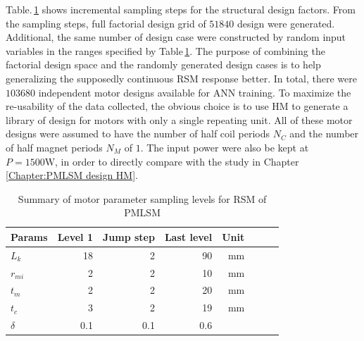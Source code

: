             
            Table.\,\ref{table:RSM design level for PMLSM} shows incremental sampling steps for the structural design factors. From the sampling steps, full factorial design grid of $51840$ design were generated. Additional, the same number of design case were constructed by random input variables in the ranges specified by Table\,\ref{table:RSM design level for PMLSM}. The purpose of combining the factorial design space and the randomly generated design cases is to help generalizing the supposedly continuous \acs{RSM} response better. In total, there were $103680$ independent motor designs available for \acs{ANN} training. To maximize the re-usability of the data collected, the obvious choice is to use \acs{HM} to generate a library of design for motors with only a single repeating unit. All of these motor designs were assumed to have the number of half coil periods $N_C$ and the number of half magnet periods $N_M$ of $1$. The input power were also be kept at $P=1500\mathrm{W}$, in order to directly compare with the study in Chapter\,\ref{Chapter:PMLSM design HM}.
            
            
            \begin{table}[!h]
                \renewcommand{\arraystretch}{1.2}
                \caption{Summary of motor parameter sampling levels for \acs{RSM} of \acs{PMLSM}}
                \label{table:RSM design level for PMLSM}
                \centering
                \begin{tabular}{@{}l r r r r r r r@{}}
                \hline
                \bfseries Params & \bfseries Level 1 & \bfseries Jump step & \bfseries Last level & \bfseries Unit \\
                \hline
                    $L_k$       &   18     &   2     &   90     &   $\mathrm{mm}$\\
                    $r_{mi}$    &    2     &   2     &   10     &   $\mathrm{mm}$\\
                    $t_m$       &    2     &   2     &   20     &   $\mathrm{mm}$\\
                    $t_c$       &    3     &   2     &   19     &   $\mathrm{mm}$\\
                    $\delta$    &  0.1     & 0.1     &  0.6     &   \\
                \hline
                \end{tabular}
            \end{table}
        
        
